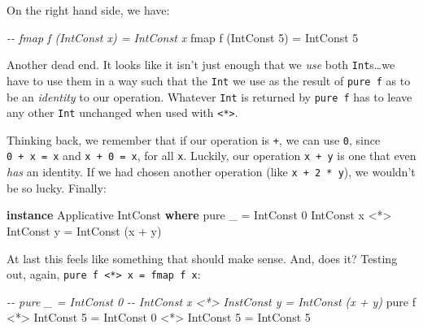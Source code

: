 \documentclass[]{article}
\newenvironment{Shaded}{}{}
\newcommand{\CommentTok}[1]{\textcolor[rgb]{0.38,0.63,0.69}{\textit{#1}}}
\newcommand{\DataTypeTok}[1]{\textcolor[rgb]{0.56,0.13,0.00}{#1}}
\newcommand{\DecValTok}[1]{\textcolor[rgb]{0.25,0.63,0.44}{#1}}
\newcommand{\FunctionTok}[1]{\textcolor[rgb]{0.02,0.16,0.49}{#1}}
\newcommand{\KeywordTok}[1]{\textcolor[rgb]{0.00,0.44,0.13}{\textbf{#1}}}
\newcommand{\NormalTok}[1]{#1}
\newcommand{\OperatorTok}[1]{\textcolor[rgb]{0.40,0.40,0.40}{#1}}
\newcommand{\OtherTok}[1]{\textcolor[rgb]{0.00,0.44,0.13}{#1}}
\begin{document}
On the right hand side, we have:

\begin{Shaded}
\begin{Highlighting}[]
\CommentTok{{-}{-} fmap f (IntConst x) = IntConst x}
\FunctionTok{fmap}\NormalTok{ f (}\DataTypeTok{IntConst} \DecValTok{5}\NormalTok{) }\OtherTok{=} \DataTypeTok{IntConst} \DecValTok{5}
\end{Highlighting}
\end{Shaded}

Another dead end. It looks like it isn't just enough that we \emph{use} both
\texttt{Int}s\ldots we have to use them in a way such that the \texttt{Int} we
use as the result of \texttt{pure\ f} as to be an \emph{identity} to our
operation. Whatever \texttt{Int} is returned by \texttt{pure\ f} has to leave
any other \texttt{Int} unchanged when used with
\texttt{\textless{}*\textgreater{}}.

Thinking back, we remember that if our operation is \texttt{+}, we can use
\texttt{0}, since \texttt{0\ +\ x\ =\ x} and \texttt{x\ +\ 0\ =\ x}, for all
\texttt{x}. Luckily, our operation \texttt{x\ +\ y} is one that even \emph{has}
an identity. If we had chosen another operation (like \texttt{x\ +\ 2\ *\ y}),
we wouldn't be so lucky. Finally:

\begin{Shaded}
\begin{Highlighting}[]
\KeywordTok{instance} \DataTypeTok{Applicative} \DataTypeTok{IntConst} \KeywordTok{where}
    \FunctionTok{pure}\NormalTok{ \_                    }\OtherTok{=} \DataTypeTok{IntConst} \DecValTok{0}
    \DataTypeTok{IntConst}\NormalTok{ x }\OperatorTok{<*>} \DataTypeTok{IntConst}\NormalTok{ y }\OtherTok{=} \DataTypeTok{IntConst}\NormalTok{ (x }\OperatorTok{+}\NormalTok{ y)}
\end{Highlighting}
\end{Shaded}

At last this feels like something that should make sense. And, does it? Testing
out, again, \texttt{pure\ f\ \textless{}*\textgreater{}\ x\ =\ fmap\ f\ x}:

\begin{Shaded}
\begin{Highlighting}[]
\CommentTok{{-}{-} pure \_                     = IntConst 0}
\CommentTok{{-}{-} IntConst x <*> InstConst y = IntConst (x + y)}
\FunctionTok{pure}\NormalTok{ f }\OperatorTok{<*>} \DataTypeTok{IntConst} \DecValTok{5} \OtherTok{=} \DataTypeTok{IntConst} \DecValTok{0} \OperatorTok{<*>} \DataTypeTok{IntConst} \DecValTok{5}
                      \OtherTok{=} \DataTypeTok{IntConst} \DecValTok{5}
\end{Highlighting}
\end{Shaded}
\end{document}
